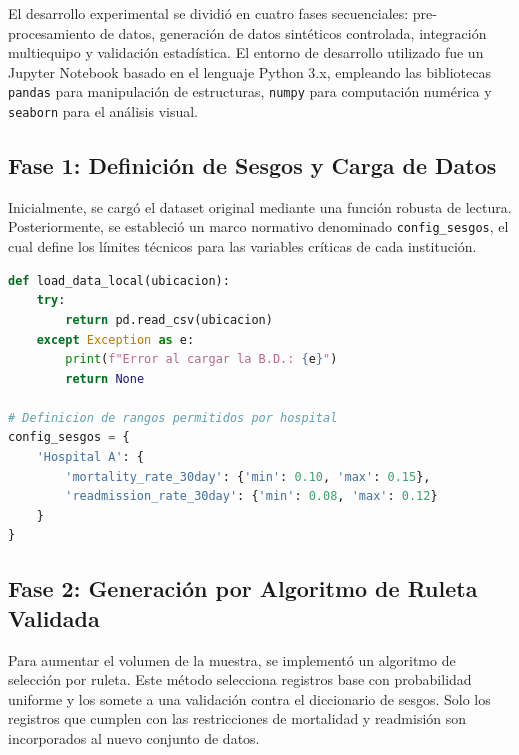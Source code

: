 \documentclass[12pt]{article}
\begin{document}
El desarrollo experimental se dividió en cuatro fases secuenciales: pre-procesamiento de datos, generación de datos sintéticos controlada, integración multiequipo y validación estadística. El entorno de desarrollo utilizado fue un Jupyter Notebook basado en el lenguaje Python 3.x, empleando las bibliotecas \texttt{pandas} para manipulación de estructuras, \texttt{numpy} para computación numérica y \texttt{seaborn} para el análisis visual.

\subsection{Fase 1: Definición de Sesgos y Carga de Datos}
Inicialmente, se cargó el dataset original mediante una función robusta de lectura. Posteriormente, se estableció un marco normativo denominado \texttt{config\_sesgos}, el cual define los límites técnicos para las variables críticas de cada institución.

\begin{lstlisting}[language=Python, caption={Carga de datos y reglas de negocio}]
def load_data_local(ubicacion):
    try:
        return pd.read_csv(ubicacion)
    except Exception as e:
        print(f"Error al cargar la B.D.: {e}")
        return None

# Definicion de rangos permitidos por hospital
config_sesgos = {
    'Hospital A': {
        'mortality_rate_30day': {'min': 0.10, 'max': 0.15},
        'readmission_rate_30day': {'min': 0.08, 'max': 0.12}
    }
}
\end{lstlisting}

\subsection{Fase 2: Generación por Algoritmo de Ruleta Validada}
Para aumentar el volumen de la muestra, se implementó un algoritmo de selección por ruleta. Este método selecciona registros base con probabilidad uniforme y los somete a una validación contra el diccionario de sesgos. Solo los registros que cumplen con las restricciones de mortalidad y readmisión son incorporados al nuevo conjunto de datos.
\end{document}
